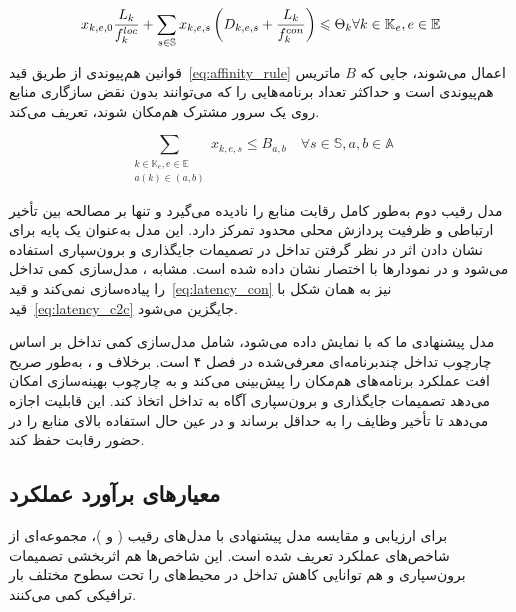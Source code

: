 \begin{equation} \label{eq:latency_c2c}
    x_{k,e,0}\frac{L_k}{f^{loc}_k} + \sum_{s \in \mathbb{S}} x_{k,e,s} \left(D_{k,e,s} + \frac{L_k}{f^{con}_k} \right) \leq \Theta_k \\ \forall k \in \mathbb{K}_e, e \in \mathbb{E}
\end{equation}

قوانین هم‌پیوندی از طریق قید~\eqref{eq:affinity_rule} اعمال می‌شوند، جایی که $B$ ماتریس هم‌پیوندی است و حداکثر تعداد برنامه‌هایی را که می‌توانند بدون نقض سازگاری منابع روی یک سرور مشترک هم‌مکان شوند، تعریف می‌کند.

\begin{equation} \label{eq:affinity_rule}
    \sum_{\substack{k \in \mathbb{K}_e, e \in \mathbb{E} \\ a(k) \in (a,b)}} x_{k,e,s} \leq B_{a,b} \quad \forall s \in \mathbb{S}, a,b \in \mathbb{A}
\end{equation}

مدل رقیب دوم به‌طور کامل رقابت منابع را نادیده می‌گیرد و تنها بر مصالحه بین تأخیر ارتباطی و ظرفیت پردازش محلی محدود تمرکز دارد. این مدل به‌عنوان یک پایه برای نشان دادن اثر در نظر گرفتن تداخل در تصمیمات جایگذاری و برون‌سپاری استفاده می‌شود و در نمودارها با اختصار  نشان داده شده است. مشابه ،  مدل‌سازی کمی تداخل را پیاده‌سازی نمی‌کند و قید~\eqref{eq:latency_con} نیز به همان شکل با قید~\eqref{eq:latency_c2c} جایگزین می‌شود.

مدل پیشنهادی ما که با  نمایش داده می‌شود، شامل مدل‌سازی کمی تداخل بر اساس چارچوب تداخل چندبرنامه‌ای معرفی‌شده در فصل ۴ است. برخلاف  و ،  به‌طور صریح افت عملکرد برنامه‌های هم‌مکان را پیش‌بینی می‌کند و به چارچوب بهینه‌سازی امکان می‌دهد تصمیمات جایگذاری و برون‌سپاری آگاه به تداخل اتخاذ کند. این قابلیت  اجازه می‌دهد تا تأخیر وظایف را به حداقل برساند و در عین حال استفاده بالای منابع  را در حضور رقابت حفظ کند.

\subsection{معیارهای برآورد عملکرد}

برای ارزیابی و مقایسه مدل پیشنهادی  با مدل‌های رقیب ( و )، مجموعه‌ای از شاخص‌های عملکرد تعریف شده است. این شاخص‌ها هم اثربخشی تصمیمات برون‌سپاری و هم توانایی کاهش تداخل در محیط‌های  را تحت سطوح مختلف بار ترافیکی کمی می‌کنند.

